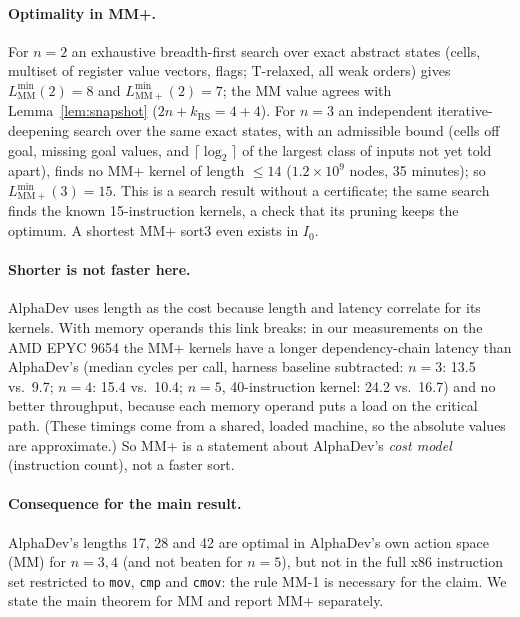 \paragraph{Optimality in MM+.} For $n = 2$ an exhaustive breadth-first search over exact abstract states (cells, multiset of
register value vectors, flags; T-relaxed, all weak orders) gives $L^{\min}_{\mathrm{MM}}(2) = 8$ and
$L^{\min}_{\mathrm{MM+}}(2) = 7$; the MM value agrees with Lemma~\ref{lem:snapshot} ($2n + k_{\mathrm{RS}} = 4 + 4$). For $n = 3$
an independent iterative-deepening search over the same exact states, with an admissible bound (cells off goal, missing
goal values, and $\lceil\log_2\rceil$ of the largest class of inputs not yet told apart), finds no MM+ kernel of length
$\le 14$ ($1.2 \times 10^9$ nodes, 35 minutes); so $L^{\min}_{\mathrm{MM+}}(3) = 15$. This is a search result without a
certificate; the same search finds the known 15-instruction kernels, a check that its pruning keeps the optimum. A shortest MM+ sort3 even exists in $I_0$.

\paragraph{Shorter is not faster here.} AlphaDev uses length as the cost because length and latency correlate for its
kernels. With memory operands this link breaks: in our measurements on the AMD EPYC 9654 the MM+ kernels have a longer
dependency-chain latency than AlphaDev's (median cycles per call, harness baseline subtracted: $n = 3$: 13.5 vs.\ 9.7;
$n = 4$: 15.4 vs.\ 10.4; $n = 5$, 40-instruction kernel: 24.2 vs.\ 16.7) and no better throughput, because each memory operand puts a load on the
critical path. (These timings come from a shared, loaded machine, so the absolute values are approximate.) So MM+ is a statement about AlphaDev's \emph{cost model}
(instruction count), not a faster sort.

\paragraph{Consequence for the main result.} AlphaDev's lengths 17, 28 and 42 are optimal in AlphaDev's own action space
(MM) for $n = 3, 4$ (and not beaten for $n = 5$), but not in the full x86 instruction set restricted to \texttt{mov},
\texttt{cmp} and \texttt{cmov}: the rule MM-1 is necessary for the claim. We state the main theorem for MM and report MM+ separately.
